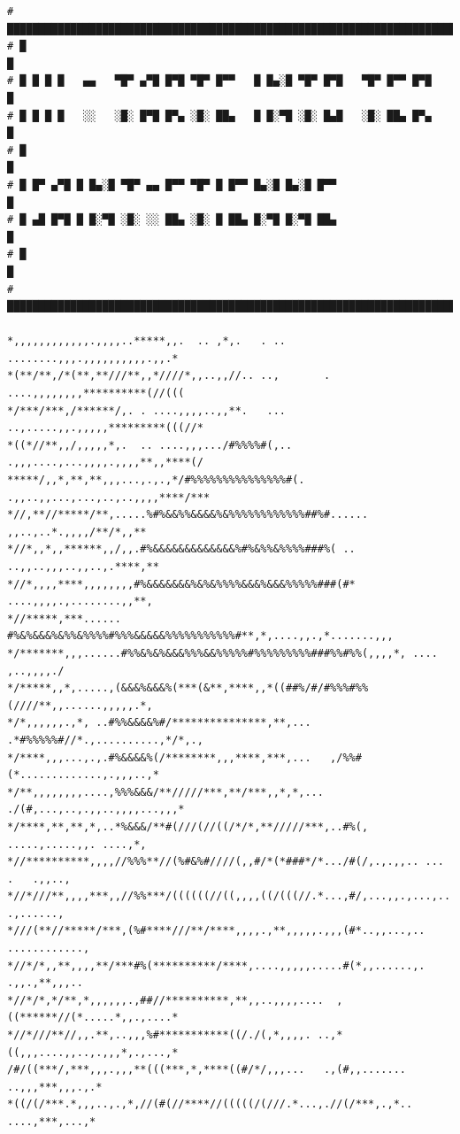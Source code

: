 \documentclass[11pt]{article}
\begin{document}
\begin{enumerate}
\begin{verbatim}
# ██████████████████████████████████████████████████████████████████████████████
# █                                                                            █
# █ █ █ █   ▄▄   ▀█▀ ▄▀█ █▀█ ▀█▀ █▀▀   █ █▄░█ ▀█▀ █▀█   ▀█▀ █▀▀ █▀█            █
# █ █ █ █   ░░   ░█░ █▀█ █▀▄ ░█░ ██▄   █ █░▀█ ░█░ █▄█   ░█░ ██▄ █▀▄            █
# █                                                                            █
# █ █▀ ▄▀█ █ █▄░█ ▀█▀ ▄▄ █▀▀ ▀█▀ █ █▀▀ █▄░█ █▄░█ █▀▀                           █
# █ ▄█ █▀█ █ █░▀█ ░█░ ░░ ██▄ ░█░ █ ██▄ █░▀█ █░▀█ ██▄                           █
# █                                                                            █
# ██████████████████████████████████████████████████████████████████████████████

*,,,,,,,,,,,,.,,,,..*****,,.  .. ,*,.   . ..        ........,,,.,,,,,,,,,,.,,.*
*(**/**,/*(**,**///**,,*////*,,..,,//.. ..,       . ....,,,,,,,,**********(//(((
*/***/***,/******/,. . ....,,,,..,,**.   ...     ..,.....,,.,,,,,*********(((//*
*((*//**,,/,,,,,*,.  .. ....,,,.../#%%%%#(,..    .,,,....,...,,,,.,,,,**,,****(/
*****/,,*,**,**,,,...,.,.,*/#%%%%%%%%%%%%%%%#(. .,,..,,...,...,..,..,,,,****/***
*//,**//*****/**,.....%#%&&%%&&&&%&%%%%%%%%%%%%##%#...... ,,..,..*.,,,,/**/*,,**
*//*,,*,,******,,/,,.#%&&&&&&&&&&&&&%#%&%%&%%%%###%( .. ..,,..,,,..,,..,.****,**
*//*,,,,****,,,,,,,,#%&&&&&&&%&%&%%%%&&&%&&&%%%%%###(#*  ....,,,,.,........,,**,
*//*****,***...... #%&%&&&%&%%&%%%%#%%%&&&&&%%%%%%%%%%%#**,*,....,,.,*.......,,,
*/*******,,,......#%%&%&%&&&%%%&&%%%%%#%%%%%%%%%###%%#%%(,,,,*, ....   ,..,,,,./
*/*****,,*,.....,(&&&%&&&%(***(&**,****,,*((##%/#/#%%%#%%(////**,,......,,,,,.*,
*/*,,,,,,.,*, ..#%%&&&&%#/***************,**,... .*#%%%%%#//*.,..........,*/*,.,
*/****,,,...,.,.#%&&&&%(/********,,,****,***,...   ,/%%#(*.............,.,,,..,*
*/**,,,,,,,,....,%%%&&&/**/////***,**/***,,*,*,...  ./(#,...,..,.,,..,,,,...,,,*
*/****,**,**,*,..*%&&&/**#(///(//((/*/*,**/////***,..#%(, .....,.....,,. ....,*,
*//**********,,,,//%%%**//(%#&%#////(,,#/*(*###*/*.../#(/,.,.,,.. ... .   .,,..,
*//*///**,,,,***,,//%%***/((((((//((,,,,((/(((//.*...,#/,...,,.,...,.. .,......,
*///(**//*****/***,(%#****///**/****,,,,.,**,,,,,.,,,(#*..,,...,.. ............,
*//*/*,,**,,,,**/***#%(**********/****,....,,,,,.....#(*,,......,.  .,,.,**,,,..
*//*/*,*/**,*,,,,,,.,##//**********,**,,..,,,,....  ,((******//(*.....*,,.,....*
*//*///**//,,.**,..,,,%#***********((/./(,*,,,,. ..,*((,,,....,,..,.,,,*,.,...,*
/#/((***/,***,,,.,,,**(((***,*,****((#/*/,,,...   .,(#,,.......  ..,,,***,,,.,.*
*((/(/***.*,,,..,.,*,//(#(//****//(((((/(///.*...,.//(/***,.,*..  ....,***,...,*

\end{verbatim}
\end{enumerate}
\end{document}
